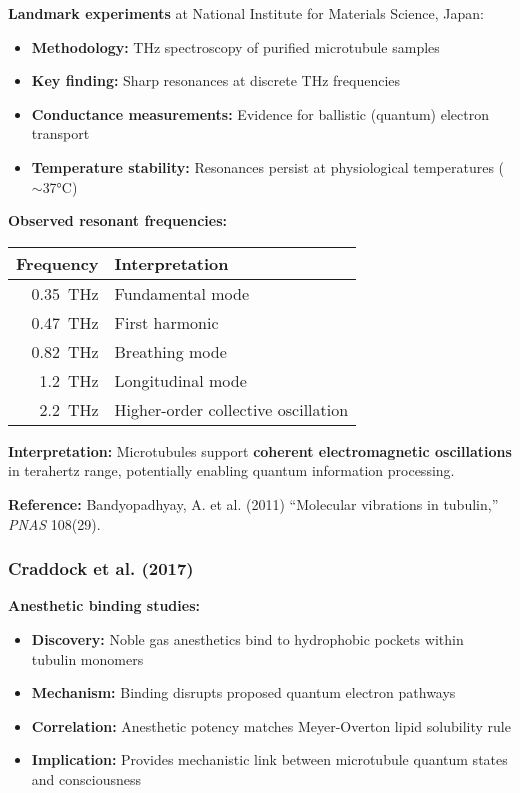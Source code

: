 \textbf{Landmark experiments} at National Institute for Materials Science, Japan:

\begin{itemize}
\item \textbf{Methodology:} THz spectroscopy of purified microtubule samples
\item \textbf{Key finding:} Sharp resonances at discrete THz frequencies
\item \textbf{Conductance measurements:} Evidence for ballistic (quantum) electron transport
\item \textbf{Temperature stability:} Resonances persist at physiological temperatures ($\sim$37°C)
\end{itemize}

\textbf{Observed resonant frequencies:}
\begin{center}
\begin{tabular}{@{}rl@{}}
\toprule
Frequency & Interpretation \\
\midrule
0.35~THz & Fundamental mode \\
0.47~THz & First harmonic \\
0.82~THz & Breathing mode \\
1.2~THz & Longitudinal mode \\
2.2~THz & Higher-order collective oscillation \\
\bottomrule
\end{tabular}
\end{center}

\textbf{Interpretation:} Microtubules support \textbf{coherent electromagnetic oscillations} in terahertz range, potentially enabling quantum information processing.

\textbf{Reference:} Bandyopadhyay, A. et al. (2011) ``Molecular vibrations in tubulin,'' \textit{PNAS} 108(29).

\subsubsection{Craddock et al. (2017)}

\textbf{Anesthetic binding studies:}
\begin{itemize}
\item \textbf{Discovery:} Noble gas anesthetics bind to hydrophobic pockets within tubulin monomers
\item \textbf{Mechanism:} Binding disrupts proposed quantum electron pathways
\item \textbf{Correlation:} Anesthetic potency matches Meyer-Overton lipid solubility rule
\item \textbf{Implication:} Provides mechanistic link between microtubule quantum states and consciousness
\end{itemize}


